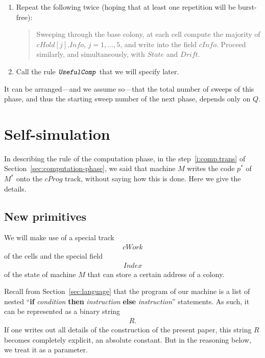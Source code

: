 \documentclass[12pt]{memoir}
\newcommand{\fld}[1]{\ensuremath{\textit{#1}}}
\newcommand{\rul}[1]{\ensuremath{\texttt{\slshape #1\/}}}
\newcommand{\Drift}{\fld{Drift}}
\newcommand{\cHold}{\fld{cHold}}
\newcommand{\Index}{\fld{Index}}
\newcommand{\Info}{\fld{Info}}
\newcommand{\cInfo}{\fld{cInfo}}
\newcommand{\cProg}{\fld{cProg}}
\newcommand{\State}{\fld{State}}
\newcommand{\cWork}{\fld{cWork}}
\newcommand{\UsefulComp}{\rul{UsefulComp}}
\begin{document}
\begin{enumerate}
\begin{enumerate}
        \end{enumerate}

      \item Repeat the following twice (hoping that at least
        one repetition will be burst-free):

          \begin{quote}
            Sweeping through the base colony,
            at each cell compute the majority of \( \cHold[j].\Info \), \( j=1,\dots,5 \),
            and write into the field \( \cInfo \).
            Proceed similarly, and simultaneously, with \( \State \) and \( \Drift \).
          \end{quote}

       \item Call the rule $\UsefulComp$ that we will specify later.
  \end{enumerate}

It can be arranged---and we assume so---that the total number of sweeps of this
phase, and thus the starting sweep number of the next phase,
depends only on \( Q \).

\section{Self-simulation}\label{sec:self-simulation}

In describing the rule of the computation phase,
in the step~\ref{i:comp.trans} of Section~\ref{sec:computation-phase},
we said that machine $M$ writes the code \( p^{*} \)
of \( M^{*} \) onto the $\cProg$ track, without saying how this is done.
Here we give the details.

\subsection{New primitives}

We will make use of a special track
\begin{align*}
   \cWork
 \end{align*}
of the cells and the special field
\begin{align*}
   \Index
 \end{align*}
of the state of machine \( M \) that can store a certain address of a colony.

Recall from Section~\ref{sec:language} that the program
of our machine is a list of nested
``\textbf{if} \emph{condition} \textbf{then} \emph{instruction}
\textbf{else} \emph{instruction}''
statements.
As such, it can be represented as a binary string 
 \begin{align*}
   R.
 \end{align*}
If one writes out all details of the construction of the present paper, this string \( R \)
becomes completely explicit, an absolute constant.
But in the reasoning below, we treat it as a parameter.
\end{document}
